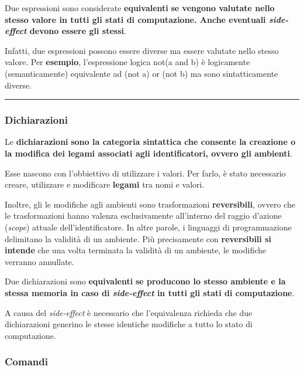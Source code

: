 \documentclass[a4paper]{article}
\newcommand{\longline}{\noindent\rule{\textwidth}{0.4pt}}
\begin{document}
	\noindent
	\begin{boxdef}
		Due espressioni sono considerate \textcolor{Red3}{\textbf{equivalenti}} \textbf{se vengono valutate nello stesso valore in tutti gli stati di computazione. Anche eventuali \emph{side-effect} devono essere gli stessi}.
	\end{boxdef}
	
	Infatti, due espressioni possono essere diverse ma essere valutate nello stesso valore. Per \textcolor{Green4}{\textbf{esempio}}, l'espressione logica \textsf{not(a and b)} è logicamente (semanticamente) equivalente ad \textsf{(not a) or (not b)} ma sono sintatticamente diverse.
	
	\longline
	
	\subsubsection{Dichiarazioni}
	
	Le \textcolor{Red3}{\textbf{dichiarazioni}} \textbf{sono la categoria sintattica che consente la creazione o la modifica dei legami associati agli identificatori, ovvero gli ambienti}.\newline
	
	\noindent
	Esse nascono con l'obbiettivo di utilizzare i valori. Per farlo, è stato necessario creare, utilizzare e modificare \textbf{legami} tra nomi e valori.\newline
	
	\noindent
	Inoltre, gli le modifiche agli ambienti sono trasformazioni \textbf{reversibili}, ovvero che le trasformazioni hanno valenza esclusivamente all'interno del raggio d'azione (\emph{scope}) attuale dell'identificatore. In altre parole, i linguaggi di programmazione delimitano la validità di un ambiente. Più precisamente con \textbf{reversibili si intende} che una volta terminata la validità di un ambiente, le modifiche verranno annullate.\newline
	
	\noindent
	\begin{boxdef}
		Due dichiarazioni sono \textcolor{Red3}{\textbf{equivalenti}} \textbf{se producono lo stesso ambiente e la stessa memoria in caso di \emph{side-effect} in tutti gli stati di computazione}.
	\end{boxdef}
	A causa del \emph{side-effect} è necessario che l'equivalenza richieda che due dichiarazioni generino le stesse identiche modifiche a tutto lo stato di computazione.\newpage
	
	\subsubsection{Comandi}
	
\end{document}
